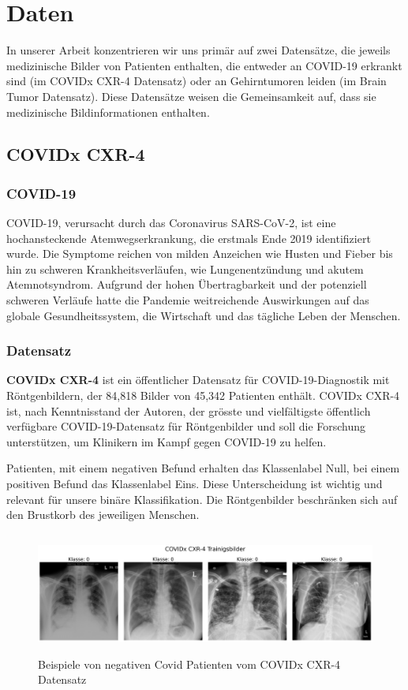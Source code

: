 \section{Daten}\label{chap:Daten}

In unserer Arbeit konzentrieren wir uns primär auf zwei Datensätze, die jeweils medizinische Bilder von Patienten enthalten, die entweder an COVID-19 erkrankt sind (im COVIDx CXR-4 Datensatz) oder an Gehirntumoren leiden (im Brain Tumor Datensatz). Diese Datensätze weisen die Gemeinsamkeit auf, dass sie medizinische Bildinformationen enthalten. 

\subsection{COVIDx CXR-4} \label{chap:COVIDX-CXR4}
\subsubsection{COVID-19} \label{chap:covid19 allgemein}
COVID-19, verursacht durch das Coronavirus SARS-CoV-2, ist eine hochansteckende Atemwegserkrankung, die erstmals Ende 2019 identifiziert wurde. Die Symptome reichen von milden Anzeichen wie Husten und Fieber bis hin zu schweren Krankheitsverläufen, wie Lungenentzündung und akutem Atemnotsyndrom. Aufgrund der hohen Übertragbarkeit und der potenziell schweren Verläufe hatte die Pandemie weitreichende Auswirkungen auf das globale Gesundheitssystem, die Wirtschaft und das tägliche Leben der Menschen. 


\subsubsection{Datensatz}
\textbf{COVIDx CXR-4} \cite{wu_covidx_2023} ist ein öffentlicher Datensatz für COVID-19-Diagnostik mit Röntgenbildern, der 84,818 Bilder von 45,342 Patienten enthält. COVIDx CXR-4 ist, nach Kenntnisstand der Autoren, der grösste und vielfältigste öffentlich verfügbare COVID-19-Datensatz für Röntgenbilder und soll die Forschung unterstützen, um Klinikern im Kampf gegen COVID-19 zu helfen.

Patienten, mit einem negativen Befund erhalten das Klassenlabel Null, bei einem positiven Befund das Klassenlabel Eins. Diese Unterscheidung ist wichtig und relevant für unsere binäre Klassifikation. Die Röntgenbilder beschränken sich auf den Brustkorb des jeweiligen Menschen.

\begin{figure}[H]
    \centering
    \includegraphics[width=\linewidth, height=4cm]{01-images/03-data/covid19-klasse0.png}
    \caption{Beispiele von negativen Covid Patienten vom COVIDx CXR-4 Datensatz}
    \label{fig:covid19-klasse0}
\end{figure}

